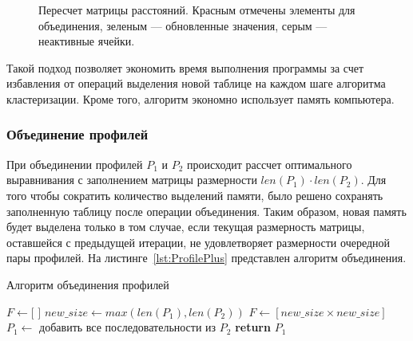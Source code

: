 \begin{figure}[h]
	\caption{Пересчет матрицы расстояний. Красным отмечены элементы для объединения, зеленым --- обновленные значения, серым --- неактивные ячейки.}
	\label{ris:UPGMA-2}
\end{figure}

Такой подход позволяет экономить время выполнения программы за счет избавления от операций выделения новой таблице на каждом шаге алгоритма кластеризации. Кроме того, алгоритм экономно использует память компьютера.

\subsubsection[Объединение профилей]{\large Объединение профилей}
\hspace{\parindent} При объединении профилей $P_1$ и $P_2$ происходит рассчет оптимального выравнивания с заполнением матрицы размерности $len(P_1) \cdot len(P_2)$. Для того чтобы сократить количество выделений памяти, было решено сохранять заполненную таблицу после операции объединения. Таким образом, новая память будет выделена только в том случае, если текущая размерность матрицы, оставшейся с предыдущей итерации, не удовлетворяет размерности очередной пары профилей. На листинге~\ref{lst:ProfilePlus} представлен алгоритм объединения.

\begin{algorithm}[H]
	\caption{Алгоритм объединения профилей} \label{lst:ProfilePlus}
	\begin{algorithmic}
		\State $F \gets [$ $]$ 
		 
			\State $new\_size \gets max(len(P_1), len(P_2))$
			\State $F \gets [new\_size \times new\_size]$ 
		\EndIf
		 
		        \State {} 
		        \State {}
		    \EndFor
        \EndFor
		 
			\State {}
			\State {}
			\State {}
        \EndWhile		
		\EndProcedure
		\State $P_1 \gets$ добавить все последовательности из $P_2$
		\State \textbf{return} $P_1$
	\end{algorithmic}
\end{algorithm}


